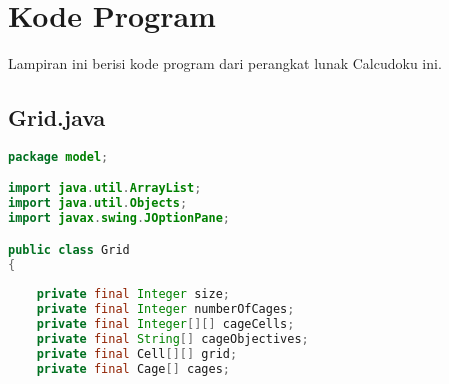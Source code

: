 \chapter{Kode Program}
\label{chap:kodeprogram}

Lampiran ini berisi kode program dari perangkat lunak Calcudoku ini.

\singlespacing 

\section{Grid.java}
\label{sec:kodeprogramgrid}

\begin{lstlisting}[language=Java,basicstyle=\tiny,caption=Grid.java]
package model;

import java.util.ArrayList;
import java.util.Objects;
import javax.swing.JOptionPane;

public class Grid
{
    
    private final Integer size;
    private final Integer numberOfCages;
    private final Integer[][] cageCells;
    private final String[] cageObjectives;
    private final Cell[][] grid;
    private final Cage[] cages;
    

\end{lstlisting}
